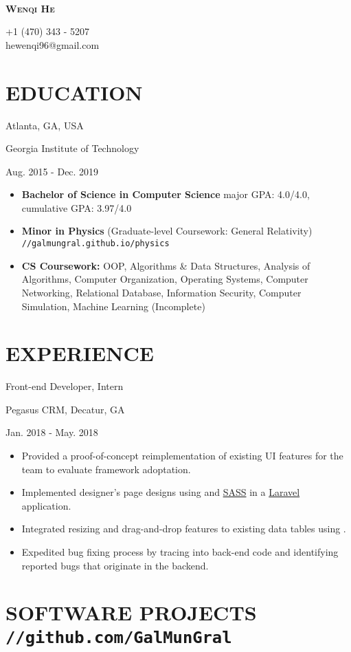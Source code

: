 \documentclass[11pt]{article}
\newcommand{\centertitle}[3]{
	{\noindent\bfseries
	\parbox[][0.5em][b]{0.35\textwidth}{#1\hfill}%
	\parbox[][0.5em][b]{0.3\textwidth}{\centerline{#2}}%
	\parbox[][0.5em][b]{0.35\textwidth}{\hfill#3}}
}
\begin{document}
\noindent
\parbox{0.2\textwidth}{\,}
\parbox{0.6\textwidth}{\centerline{\huge\scshape\bfseries Wenqi He}}
\parbox{0.2\textwidth}{+1 (470) 343 - 5207 \\hewenqi96@gmail.com}

\section*{EDUCATION}
\centertitle{Atlanta, GA, USA}{Georgia Institute of Technology}{Aug. 2015 - Dec. 2019}
\begin{itemize}[leftmargin=15pt, noitemsep, topsep=0pt]
\item \textbf{Bachelor of Science in Computer Science} \hfill major GPA: 4.0/4.0, cumulative GPA: 3.97/4.0
\item \textbf{Minor in Physics} (Graduate-level Coursework: General Relativity) \hfill \texttt{//galmungral.github.io/physics}
\item \textbf{CS Coursework:} OOP, Algorithms \& Data Structures, Analysis of Algorithms, Computer Organization, Operating Systems, Computer Networking, Relational Database, Information Security, Computer Simulation, Machine Learning (Incomplete)
\end{itemize}
\vspace{-0.5em}

\section*{EXPERIENCE}
\centertitle{Front-end Developer, Intern}{Pegasus CRM, Decatur, GA}{Jan. 2018 - May. 2018}
\begin{itemize}[leftmargin=15pt, noitemsep, topsep=0pt]
\item Provided a proof-of-concept \underline{} reimplementation of existing UI features for the team to evaluate framework adoptation.
\item Implemented designer's page designs using \underline{} and \underline{SASS} in a \underline{Laravel} application.
\item Integrated resizing and drag-and-drop features to existing data tables using \underline{}.
\item Expedited bug fixing process by tracing into back-end code and identifying reported bugs that originate in the backend.
\end{itemize}
\vspace{-0.5em}

\section*{SOFTWARE PROJECTS \hfill \normalsize\texttt{//github.com/GalMunGral}}
\end{document}
